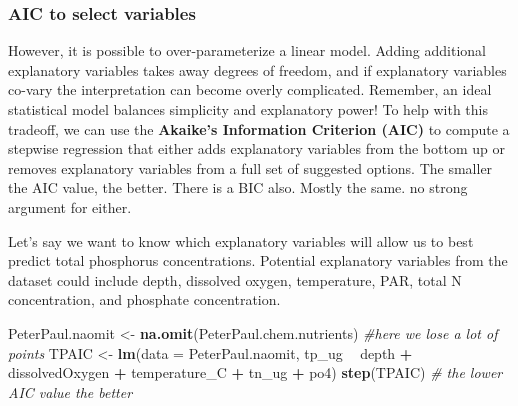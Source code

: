 \documentclass[]{article}
\newenvironment{Shaded}{\begin{snugshade}}{\end{snugshade}}
\newcommand{\KeywordTok}[1]{\textcolor[rgb]{0.13,0.29,0.53}{\textbf{#1}}}
\newcommand{\DataTypeTok}[1]{\textcolor[rgb]{0.13,0.29,0.53}{#1}}
\newcommand{\StringTok}[1]{\textcolor[rgb]{0.31,0.60,0.02}{#1}}
\newcommand{\CommentTok}[1]{\textcolor[rgb]{0.56,0.35,0.01}{\textit{#1}}}
\newcommand{\OperatorTok}[1]{\textcolor[rgb]{0.81,0.36,0.00}{\textbf{#1}}}
\newcommand{\NormalTok}[1]{#1}
\begin{document}
\subsubsection{AIC to select variables}\label{aic-to-select-variables}

However, it is possible to over-parameterize a linear model. Adding
additional explanatory variables takes away degrees of freedom, and if
explanatory variables co-vary the interpretation can become overly
complicated. Remember, an ideal statistical model balances simplicity
and explanatory power! To help with this tradeoff, we can use the
\textbf{Akaike's Information Criterion (AIC)} to compute a stepwise
regression that either adds explanatory variables from the bottom up or
removes explanatory variables from a full set of suggested options. The
smaller the AIC value, the better. There is a BIC also. Mostly the same.
no strong argument for either.

Let's say we want to know which explanatory variables will allow us to
best predict total phosphorus concentrations. Potential explanatory
variables from the dataset could include depth, dissolved oxygen,
temperature, PAR, total N concentration, and phosphate concentration.

\begin{Shaded}
\begin{Highlighting}[]
\NormalTok{PeterPaul.naomit <-}\StringTok{ }\KeywordTok{na.omit}\NormalTok{(PeterPaul.chem.nutrients) }\CommentTok{#here we lose a lot of points}
\NormalTok{TPAIC <-}\StringTok{ }\KeywordTok{lm}\NormalTok{(}\DataTypeTok{data =}\NormalTok{ PeterPaul.naomit, tp_ug }\OperatorTok{~}\StringTok{ }\NormalTok{depth }\OperatorTok{+}\StringTok{ }\NormalTok{dissolvedOxygen }\OperatorTok{+}\StringTok{ }
\StringTok{              }\NormalTok{temperature_C }\OperatorTok{+}\StringTok{ }\NormalTok{tn_ug }\OperatorTok{+}\StringTok{ }\NormalTok{po4)}
\KeywordTok{step}\NormalTok{(TPAIC) }\CommentTok{# the lower AIC value the better}
\end{Highlighting}
\end{Shaded}
\end{document}
